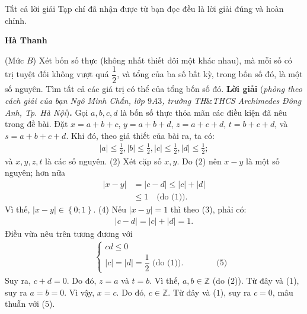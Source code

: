 \begin{multicols}{2}
	\vskip 0.05cm	
	Tất cả lời giải Tạp chí đã nhận được từ bạn đọc đều là lời giải đúng và hoàn chỉnh.
	\begin{flushright}
		\textbf{\color{thachthuctoanhoc}Hà Thanh}
	\end{flushright}
	{}
	(Mức $B$) Xét bốn số thực (không nhất thiết đôi một khác nhau), mà mỗi số có trị tuyệt đối không vượt quá $\dfrac{1}{2}$, và tổng của ba số bất kỳ, trong bốn số đó, là một số nguyên. Tìm tất cả các giá trị có thể của tổng bốn số đó.
	\vskip 0.05cm
	\textbf{\color{thachthuctoanhoc}Lời giải} (\textit{phỏng theo cách giải của bạn Ngô Minh Chấn, lớp $9$A$3$, trường TH$\&$THCS Archimedes Đông Anh, Tp. Hà Nội})\textbf{\color{thachthuctoanhoc}.}
	\vskip 0.05cm
	Gọi $a, b, c, d$ là bốn số thực thỏa mãn các điều kiện đã nêu trong đề bài.
	\vskip 0.05cm
	Đặt $x = a \!+\! b \!+\! c$, $y = a \!+\! b \!+\! d$, $z = a \!+\! c \!+\! d$, $t = b + c + d$, và
	$s = a + b + c + d$.
	\vskip 0.05cm
	Khi đó, theo giả thiết của bài ra, ta có:
	\begin{align*}
		|a| \le \frac{1}{2}, |b| \le \frac{1}{2},|c| \le \frac{1}{2},|d| \le \frac{1}{2}; \tag{$1$}
	\end{align*}
	và $x, y, z, t$ là các số nguyên.        \hfill ($2$)
	\vskip 0.05cm
	Xét cặp số $x, y$.
	Do ($2$) nên $x - y$ là một số nguyên; hơn nữa
	\begin{align*}
		\left| {x - y} \right| &= \left| {c - d} \right| \le |c| + \left| {d} \right| \\
		&\le 1 \quad\text{(do ($1$))}. \tag{$3$}
	\end{align*}
	Vì thế, $\left| {x - y} \right| \in \left\{ {0;1} \right\}.$ \hfill ($4$)
	\vskip 0.05cm
	Nếu $|x - y| = 1$  thì theo ($3$), phải có:
	\begin{align*}
		\left| {c - d} \right| = |c| + \left| {d} \right| = 1.
	\end{align*}
	Điều vừa nêu trên tương đương với
	\begin{align*}
	\quad\quad	\begin{cases}
			cd \le 0\\
			|c| = |d| = \dfrac{1}{2} \text{ (do ($1$)).} \quad\quad\quad\quad \text{($5$)} 
		\end{cases}
	\end{align*}
	Suy ra, $c + d = 0$. Do đó, $z = a$ và $t = b$. Vì thế, $a,b \in \mathbb{Z}$  (do ($2$)). Từ đây và ($1$), suy ra $a = b = 0$.
	\vskip 0.05cm
	Vì vậy, $x = c$. Do đó,  $c \in \mathbb{Z}$. Từ đây và ($1$), suy ra $c = 0$, mâu thuẫn với ($5$).

\end{multicols}
